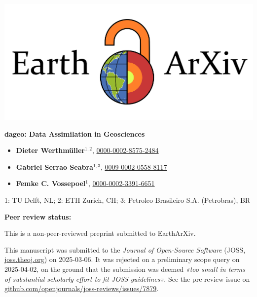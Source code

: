 \documentclass[a4paper, colorlinks=false, 11pt, parskip=half,
               notitlepage, oneside, fleqn, pdftex]{scrartcl}
\begin{document}
\thispagestyle{empty}

\begin{centering}
\includegraphics{ealogo.png}\\
\end{centering}

\bigskip

\textbf{\LARGE dageo: Data Assimilation in Geosciences}\\

\bigskip

\begin{itemize}
  \item \textbf{Dieter Werthmüller}$^{1, 2}$,
  \href{https://orcid.org/0000-0002-8575-2484}{0000-0002-8575-2484}
  \item \textbf{Gabriel Serrao Seabra}$^{1, 3}$,
  \href{https://orcid.org/0009-0002-0558-8117}{0009-0002-0558-8117}
  \item \textbf{Femke C. Vossepoel}$^{1}$,
  \href{https://orcid.org/0000-0002-3391-6651}{0000-0002-3391-6651}
\end{itemize}

{\small
  1: TU Delft, NL; 2: ETH Zurich, CH; 3: Petroleo Brasileiro S.A. (Petrobras), BR
}


\bigskip

{\Large
\textbf{Peer review status:}

This is a non-peer-reviewed preprint submitted to EarthArXiv.
}

\bigskip

This manuscript was submitted to the \emph{Journal of Open-Source Software}
(JOSS, \href{https://joss.theoj.org}{joss.theoj.org}) on 2025-03-06. It was
rejected on a preliminary scope query on 2025-04-02, on the ground that the
submission was deemed \emph{«too small in terms of substantial scholarly effort
to fit JOSS guidelines»}. See the pre-review issue on
\href{https://github.com/openjournals/joss-reviews/issues/7879}{github.com/openjournals/joss-reviews/issues/7879}.
\end{document}
